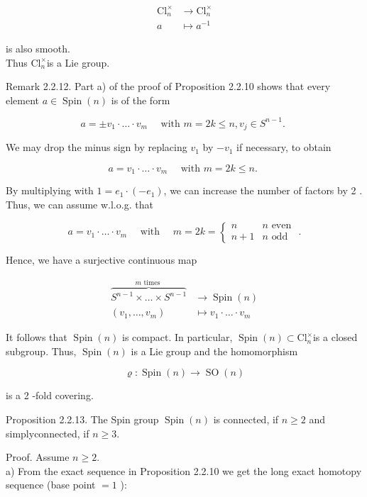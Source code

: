 \documentclass[10pt, letterpaper]{article}
\begin{document}
$$
\begin{aligned}
\mathrm{Cl}_{n}^{\times} & \rightarrow \mathrm{Cl}_{n}^{\times} \\
a & \mapsto a^{-1}
\end{aligned}
$$

is also smooth.\\
Thus $\mathrm{Cl}_{n}^{\times}$is a Lie group.

Remark 2.2.12. Part a) of the proof of Proposition 2.2.10 shows that every element $a \in \operatorname{Spin}(n)$ is of the form

$$
a= \pm v_{1} \cdot \ldots \cdot v_{m} \quad \text { with } m=2 k \leq n, v_{j} \in S^{n-1} \text {. }
$$

We may drop the minus sign by replacing $v_{1}$ by $-v_{1}$ if necessary, to obtain

$$
a=v_{1} \cdot \ldots \cdot v_{m} \quad \text { with } m=2 k \leq n \text {. }
$$

By multiplying with $1=e_{1} \cdot\left(-e_{1}\right)$, we can increase the number of factors by 2 . Thus, we can assume w.l.o.g. that

$$
a=v_{1} \cdot \ldots \cdot v_{m} \quad \text { with } \quad m=2 k=\left\{\begin{array}{ll}
n & n \text { even } \\
n+1 & n \text { odd }
\end{array} .\right.
$$

Hence, we have a surjective continuous map

$$
\begin{aligned}
\overbrace{S^{n-1} \times \ldots \times S^{n-1}}^{m \text { times }} & \rightarrow \operatorname{Spin}(n) \\
\left(v_{1}, \ldots, v_{m}\right) & \mapsto v_{1} \cdot \ldots \cdot v_{m}
\end{aligned}
$$

It follows that $\operatorname{Spin}(n)$ is compact. In particular, $\operatorname{Spin}(n) \subset \mathrm{Cl}_{n}^{\times}$is a closed subgroup. Thus, $\operatorname{Spin}(n)$ is a Lie group and the homomorphism

$$
\varrho: \operatorname{Spin}(n) \rightarrow \operatorname{SO}(n)
$$

is a 2 -fold covering.

Proposition 2.2.13. The Spin group $\operatorname{Spin}(n)$ is connected, if $n \geq 2$ and simplyconnected, if $n \geq 3$.

Proof. Assume $n \geq 2$.\\
a) From the exact sequence in Proposition 2.2.10 we get the long exact homotopy sequence (base point $=1$ ):
\end{document}
